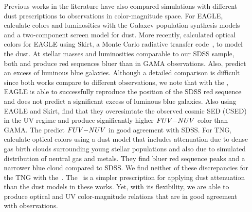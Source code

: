 Previous works in the literature have also compared simulations with different
dust prescriptions to observations in color-magnitude space. For EAGLE, 
\cite{trayford2015} calculate colors and luminosities with the {\sc Galaxev}
population synthesis models and a two-component screen model for dust. More
recently, \cite{trayford2017} calculated optical colors for EAGLE using {\sc
Skirt}, a Monte Carlo radiative transfer code~\citep{camps2015}, to model the
dust. At stellar masses and luminosities comparable to our SDSS sample, both 
\cite{trayford2015} and \cite{trayford2017} produce red sequences bluer than 
in GAMA observations. Also, \cite{trayford2015} predict an excess of luminous 
blue galaxies. Although a detailed comparison is difficult since both works 
compare to different observations, we note that with the \eda, EAGLE is able 
to successfully reproduce the position of the SDSS red sequence and does not 
predict a significant excess of luminous blue galaxies. Also using EAGLE and 
{\sc Skirt}, \cite{baes2019} find that they overesimtate the observed cosmic 
SED (CSED) in the UV regime and produce significantly higher $FUV{-}NUV$ color 
than GAMA. The \eda predict $FUV{-}NUV$ in good agreement with SDSS. 
For TNG, \cite{nelson2018} calculate optical colors using a dust model that
includes attenuation due to dense gas birth clouds surrounding young stellar
populations and also due to simulated distribution of neutral gas and metals.
They find bluer red sequence peaks and a narrower blue cloud compared to SDSS.
We find neither of these discrepancies for the TNG with the~\eda. The
\eda~is a simpler prescription for applying dust attenuation than the dust
models in these works. Yet, with its flexibility, we are able to produce
optical and UV color-magnitude relations that are in good agreement with
observations. 

 

 

